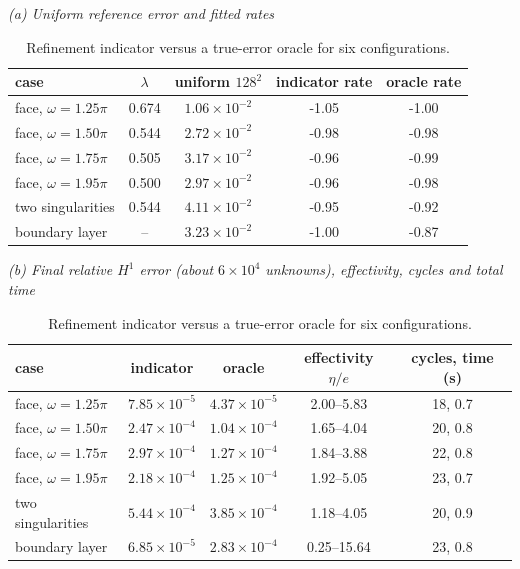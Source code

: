 \documentclass[11pt]{article}
\begin{document}
\clearpage
\begin{table}[htbp]\centering\small
\caption{Refinement indicator versus a true-error oracle for six configurations.}
\textit{(a) Uniform reference error and fitted rates}\\[2pt]
\begin{tabular}{l c c cc}
\toprule
case & $\lambda$ & uniform $128^2$ & indicator rate & oracle rate\\
\midrule
face, $\omega=1.25\pi$ & 0.674 & $1.06{\times}10^{-2}$ & -1.05 & -1.00\\
face, $\omega=1.50\pi$ & 0.544 & $2.72{\times}10^{-2}$ & -0.98 & -0.98\\
face, $\omega=1.75\pi$ & 0.505 & $3.17{\times}10^{-2}$ & -0.96 & -0.99\\
face, $\omega=1.95\pi$ & 0.500 & $2.97{\times}10^{-2}$ & -0.96 & -0.98\\
two singularities & 0.544 & $4.11{\times}10^{-2}$ & -0.95 & -0.92\\
boundary layer & -- & $3.23{\times}10^{-2}$ & -1.00 & -0.87\\
\bottomrule
\end{tabular}

\medskip
\textit{(b) Final relative $H^1$ error (about $6\times10^4$ unknowns), effectivity, cycles and total time}\\[2pt]
\begin{tabular}{l cc c c}
\toprule
case & indicator & oracle & effectivity $\eta/e$ & cycles, time (s)\\
\midrule
face, $\omega=1.25\pi$ & $7.85{\times}10^{-5}$ & $4.37{\times}10^{-5}$ & 2.00--5.83 & 18, 0.7\\
face, $\omega=1.50\pi$ & $2.47{\times}10^{-4}$ & $1.04{\times}10^{-4}$ & 1.65--4.04 & 20, 0.8\\
face, $\omega=1.75\pi$ & $2.97{\times}10^{-4}$ & $1.27{\times}10^{-4}$ & 1.84--3.88 & 22, 0.8\\
face, $\omega=1.95\pi$ & $2.18{\times}10^{-4}$ & $1.25{\times}10^{-4}$ & 1.92--5.05 & 23, 0.7\\
two singularities & $5.44{\times}10^{-4}$ & $3.85{\times}10^{-4}$ & 1.18--4.05 & 20, 0.9\\
boundary layer & $6.85{\times}10^{-5}$ & $2.83{\times}10^{-4}$ & 0.25--15.64 & 23, 0.8\\
\bottomrule
\end{tabular}
\end{table}
\end{document}
